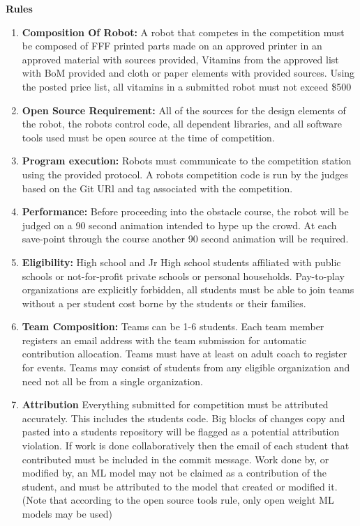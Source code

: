 \documentclass{article}
\begin{document}
  \pagebreak
{\huge \textbf{Rules}}

\begin{enumerate}
	
\item \textbf{Composition Of Robot:} A robot that competes in the competition must be composed of FFF printed parts made on an approved printer in an approved material with sources provided, Vitamins from the approved list with BoM provided and cloth or paper elements with provided sources. Using the posted price list, all vitamins in a submitted robot must not exceed \$500

\item \textbf{Open Source Requirement:} All of the sources for the design elements of the robot, the robots control code, all dependent libraries, and all software tools used must be open source at the time of competition. 

\item \textbf{Program execution:} Robots must communicate to the competition station using the provided protocol. A robots competition code is run by the judges based on the Git URl and tag associated with the competition. 


\item \textbf{Performance:} Before proceeding into the obstacle course, the robot will be judged on a 90 second animation intended to hype up the crowd. At each save-point through the course another 90 second animation will be required. 

\item \textbf{Eligibility:} High school and Jr High school students affiliated with public schools or not-for-profit private schools or personal households. Pay-to-play organizations are explicitly forbidden, all students must be able to join teams without a per student cost borne by the students or their families. 


\item \textbf{Team Composition:} Teams can be 1-6 students. Each team member registers an email address with the team submission for automatic contribution allocation. Teams must have at least on adult coach to register for events. Teams may consist of students from any eligible organization and need not all be from a single organization.  

 
\item \textbf{Attribution} Everything submitted for competition must be attributed accurately. This includes the students code. Big blocks of changes copy and pasted into a students repository will be flagged as a potential attribution violation. If work is done collaboratively then the email of each student that contributed must be included in the commit message. Work done by, or modified by, an ML model may not be claimed as a contribution of the student, and must be attributed to the model that created or modified it. (Note that according to the open source tools rule, only open weight ML models may be used)




\end{enumerate}
\end{document}

